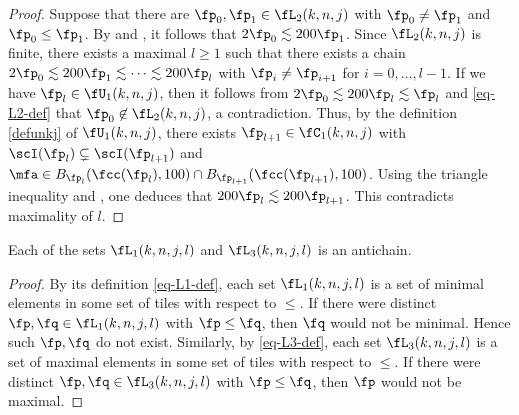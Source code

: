 \begin{proof}
    Suppose that there are $\fp_0, \fp_1 \in \fL_2(k,n,j)$ with $\fp_0 \ne \fp_1$ and $\fp_0 \le \fp_1$. By  and , it follows that $2\fp_0 \lesssim 200\fp_1$. Since $\fL_2(k,n,j)$ is finite, there exists a maximal $l \ge 1$ such that there exists a chain $2\fp_0 \lesssim 200 \fp_1 \lesssim \dotsb \lesssim 200 \fp_l$ with $\fp_i \ne \fp_{i+1}$ for $i = 0, \dotsc, l-1$.
    If we have $\fp_l \in \fU_1(k,n,j)$, then it follows from $2\fp_0 \lesssim 200 \fp_l \lesssim \fp_l$ and \eqref{eq-L2-def} that $\fp_0 \not\in \fL_2(k,n,j)$, a contradiction. Thus, by the definition \eqref{defunkj} of $\fU_1(k,n,j)$, there exists $\fp_{l+1} \in \fC_1(k,n,j)$ with $\scI(\fp_l) \subsetneq \scI(\fp_{l+1}) $ and $\mfa \in B_{\fp_l}(\fcc(\fp_l), 100) \cap B_{\fp_{l+1}}(\fcc(\fp_{l+1}), 100)$. Using the triangle inequality and , one deduces that $200 \fp_l \lesssim 200\fp_{l+1}$. This contradicts maximality of $l$.
\end{proof}

\begin{lemma}[L1 L3 antichain]
\label{L1-L3-antichain}
    Each of the sets $\fL_1(k,n,j,l)$ and $\fL_3(k,n,j,l)$ is an antichain.
\end{lemma}

\begin{proof}
    By its definition \eqref{eq-L1-def}, each set $\fL_1(k,n,j,l)$ is a set of minimal elements in some set of tiles with respect to $\le$. If there were distinct $\fp, \fq \in \fL_1(k,n,j,l)$ with $\fp \le \fq$, then $\fq$ would not be minimal. Hence such $\fp, \fq$ do not exist. Similarly, by \eqref{eq-L3-def}, each set $\fL_3(k,n,j,l)$ is a set of maximal elements in some set of tiles with respect to $\le$. If there were distinct $\fp, \fq \in \fL_3(k,n,j,l)$ with $\fp \le \fq$, then $\fp$ would not be maximal.
\end{proof}

